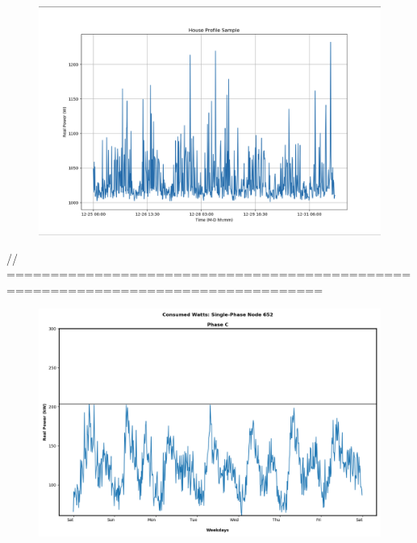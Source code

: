 \newpage

\begin{figure}[H]
    \centering
    \includegraphics[width=1.1\columnwidth]{Pictures/house_profile_sample.png}
    \caption{ }
\end{figure}

\newpage

// ==================================================================================

\begin{figure}[H]
    \centering
    \includegraphics[width=1.1\columnwidth]{Pictures/basecase_single_phase_652_power.png}
    \caption{ }
\end{figure}

\newpage

